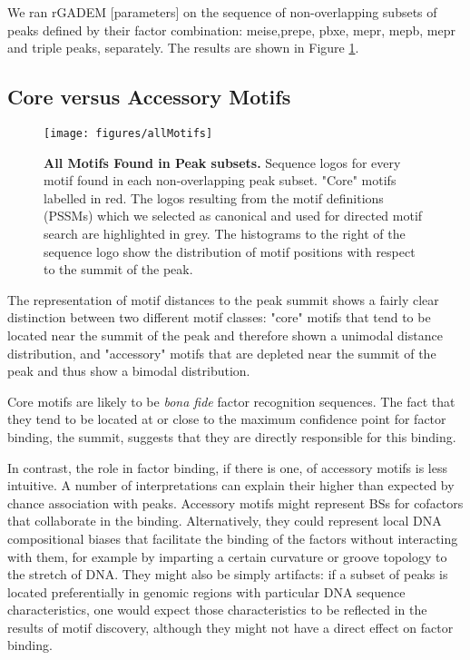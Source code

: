 We ran rGADEM [parameters] on the sequence of non-overlapping subsets of peaks defined by their factor combination: \ac{meise},\ac{prepe}, \ac{pbxe}, \ac{mepr}, \ac{mepb}, \ac{mepr} and triple peaks, separately. The results are shown in Figure \ref{fig:allMotifs}.

\subsection{Core versus Accessory Motifs}

\begin{figure}[]
    \centering
  \label{fig:allMotifs}
  \texttt{[image: figures/allMotifs]}
  \caption[All Motifs Found in Peak subsets]{\textbf{All Motifs Found in Peak subsets.} Sequence logos for every motif found in each non-overlapping peak subset. "Core" motifs labelled in red. The logos resulting from the motif definitions (\acp{PSSM}) which we selected as canonical and used for directed motif search are highlighted in grey. The histograms to the right of the sequence logo show the distribution of motif positions with respect to the summit of the peak.}
\end{figure}

The representation of motif distances to the peak summit shows a fairly clear distinction between two different motif classes: "core" motifs that tend to be located near the summit of the peak and therefore shown a unimodal distance distribution, and "accessory" motifs that are depleted near the summit of the peak and thus show a bimodal distribution. 

Core motifs are likely to be \textit{bona fide} factor recognition sequences. The fact that they tend to be located at or close to the maximum confidence point for factor binding, the summit, suggests that they are directly responsible for this binding.

In contrast, the role in factor binding, if there is one, of accessory motifs is less intuitive. A number of interpretations can explain their higher than expected by chance association with peaks. Accessory motifs might represent \acp{BS} for cofactors that collaborate in the binding. Alternatively, they could represent local DNA compositional biases that facilitate the binding of the factors without interacting with them, for example by imparting a certain curvature or groove topology to the stretch of DNA. They might also be simply artifacts: if a subset of peaks is located preferentially in genomic regions with particular DNA sequence characteristics, one would expect those characteristics to be reflected in the results of motif discovery, although they might not have a direct effect on factor binding.


